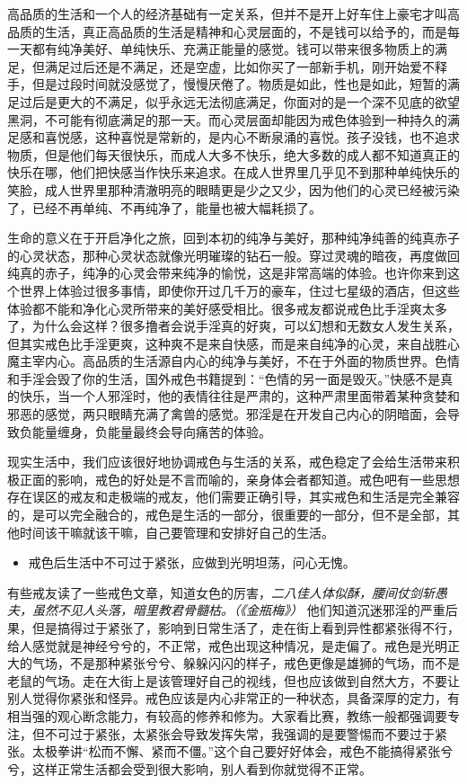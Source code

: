高品质的生活和一个人的经济基础有一定关系，但并不是开上好车住上豪宅才叫高品质的生活，真正高品质的生活是精神和心灵层面的，不是钱可以给予的，而是每一天都有纯净美好、单纯快乐、充满正能量的感觉。钱可以带来很多物质上的满足，但满足过后还是不满足，还是空虚，比如你买了一部新手机，刚开始爱不释手，但是过段时间就没感觉了，慢慢厌倦了。物质是如此，性也是如此，短暂的满足过后是更大的不满足，似乎永远无法彻底满足，你面对的是一个深不见底的欲望黑洞，不可能有彻底满足的那一天。而心灵层面却能因为戒色体验到一种持久的满足感和喜悦感，这种喜悦是常新的，是内心不断泉涌的喜悦。孩子没钱，也不追求物质，但是他们每天很快乐，而成人大多不快乐，绝大多数的成人都不知道真正的快乐在哪，他们把快感当作快乐来追求。在成人世界里几乎见不到那种单纯快乐的笑脸，成人世界里那种清澈明亮的眼睛更是少之又少，因为他们的心灵已经被污染了，已经不再单纯、不再纯净了，能量也被大幅耗损了。

生命的意义在于开启净化之旅，回到本初的纯净与美好，那种纯净纯善的纯真赤子的心灵状态，那种心灵状态就像光明璀璨的钻石一般。穿过灵魂的暗夜，再度做回纯真的赤子，纯净的心灵会带来纯净的愉悦，这是非常高端的体验。也许你来到这个世界上体验过很多事情，即使你开过几千万的豪车，住过七星级的酒店，但这些体验都不能和净化心灵所带来的美好感受相比。很多戒友都说戒色比手淫爽太多了，为什么会这样？很多撸者会说手淫真的好爽，可以幻想和无数女人发生关系，但其实戒色比手淫更爽，这种爽不是来自快感，而是来自纯净的心灵，来自战胜心魔主宰内心。高品质的生活源自内心的纯净与美好，不在于外面的物质世界。色情和手淫会毁了你的生活，国外戒色书籍提到：“色情的另一面是毁灭。”快感不是真的快乐，当一个人邪淫时，他的表情往往是严肃的，这种严肃里面带着某种贪婪和邪恶的感觉，两只眼睛充满了禽兽的感觉。邪淫是在开发自己内心的阴暗面，会导致负能量缠身，负能量最终会导向痛苦的体验。

现实生活中，我们应该很好地协调戒色与生活的关系，戒色稳定了会给生活带来积极正面的影响，戒色的好处是不言而喻的，亲身体会者都知道。戒色吧有一些思想存在误区的戒友和走极端的戒友，他们需要正确引导，其实戒色和生活是完全兼容的，是可以完全融合的，戒色是生活的一部分，很重要的一部分，但不是全部，其他时间该干嘛就该干嘛，自己要管理和安排好自己的生活。

\begin{itemize}
    \item 戒色后生活中不可过于紧张，应做到光明坦荡，问心无愧。
\end{itemize}

有些戒友读了一些戒色文章，知道女色的厉害，\textit{二八佳人体似酥，腰间仗剑斩愚夫，虽然不见人头落，暗里教君骨髓枯。（《金瓶梅》）} 他们知道沉迷邪淫的严重后果，但是搞得过于紧张了，影响到日常生活了，走在街上看到异性都紧张得不行，给人感觉就是神经兮兮的，不正常，戒色出现这种情况，是走偏了。戒色是光明正大的气场，不是那种紧张兮兮、躲躲闪闪的样子，戒色更像是雄狮的气场，而不是老鼠的气场。走在大街上是该管理好自己的视线，但也应该做到自然大方，不要让别人觉得你紧张和怪异。戒色应该是内心非常正的一种状态，具备深厚的定力，有相当强的观心断念能力，有较高的修养和修为。大家看比赛，教练一般都强调要专注，但不可过于紧张，太紧张会导致发挥失常，我强调的是要警惕而不要过于紧张。太极拳讲“松而不懈、紧而不僵。”这个自己要好好体会，戒色不能搞得紧张兮兮，这样正常生活都会受到很大影响，别人看到你就觉得不正常。

